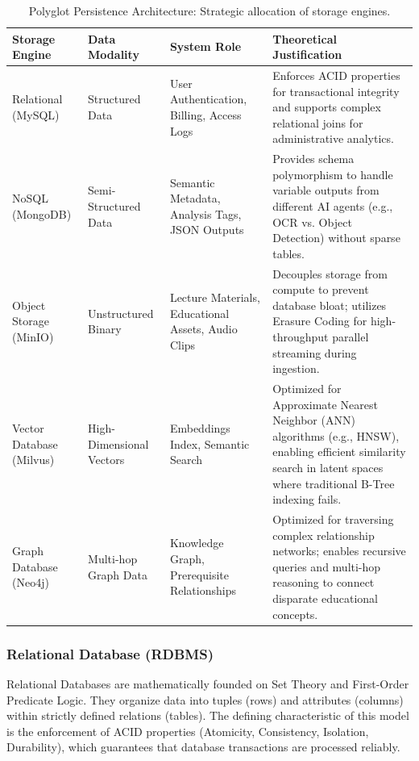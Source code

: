 \begin{table}[H]
    \centering
    \caption{Polyglot Persistence Architecture: Strategic allocation of storage engines.}\label{tab:polyglot_db}
    \renewcommand{\arraystretch}{1.5} %
    \small %
    \begin{tabularx}{\textwidth}{|p{2.0cm}|p{2.0cm}|X|X|}
    \hline
    {Storage Engine} & {Data Modality} & {System Role} & {Theoretical Justification} \\
    \hline
    Relational (MySQL) & Structured Data & User Authentication, Billing, Access Logs & Enforces ACID properties for transactional integrity and supports complex relational joins for administrative analytics. \\
    \hline
    NoSQL (MongoDB) & Semi-Structured Data & Semantic Metadata, Analysis Tags, JSON Outputs & Provides schema polymorphism to handle variable outputs from different AI agents (e.g., OCR vs. Object Detection) without sparse tables. \\
    \hline
    Object Storage (MinIO) & Unstructured Binary & Lecture Materials, Educational Assets, Audio Clips & Decouples storage from compute to prevent database bloat; utilizes Erasure Coding for high-throughput parallel streaming during ingestion. \\
    \hline
    Vector Database (Milvus) & High-Dimensional Vectors & Embeddings Index, Semantic Search & Optimized for Approximate Nearest Neighbor (ANN) algorithms (e.g., HNSW), enabling efficient similarity search in latent spaces where traditional B-Tree indexing fails. \\
    \hline
    Graph Database (Neo4j) & Multi-hop Graph Data & Knowledge Graph, Prerequisite Relationships & Optimized for traversing complex relationship networks; enables recursive queries and multi-hop reasoning to connect disparate educational concepts. \\
    \hline
    \end{tabularx}
\end{table}



\subsubsection*{Relational Database (RDBMS)}
Relational Databases are mathematically founded on Set Theory and First-Order Predicate Logic. They organize data into tuples (rows) and attributes (columns) within strictly defined relations (tables). The defining characteristic of this model is the enforcement of ACID properties (Atomicity, Consistency, Isolation, Durability), which guarantees that database transactions are processed reliably.

